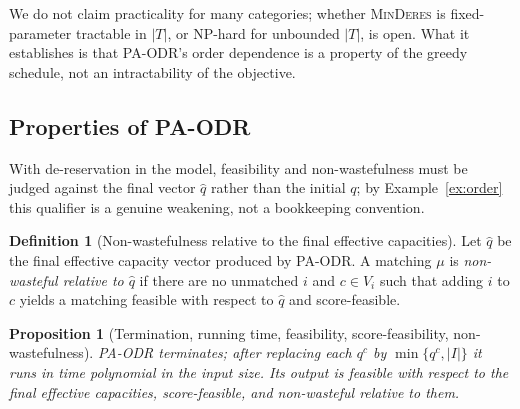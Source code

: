 \documentclass[a4paper,twoside]{article}
\newtheorem{proposition}{Proposition}
\theoremstyle{definition}
\newtheorem{definition}{Definition}
\begin{document}
We do not claim practicality for many categories; whether \textsc{MinDeres} is fixed-parameter tractable in $|T|$, or NP-hard for unbounded $|T|$, is open. What it establishes is that PA-ODR's order dependence is a property of the greedy schedule, not an intractability of the objective.

\subsection{Properties of PA-ODR}

With de-reservation in the model, feasibility and non-wastefulness must be judged against the final vector $\hat q$ rather than the initial $q$; by Example~\ref{ex:order} this qualifier is a genuine weakening, not a bookkeeping convention.

\begin{definition}[Non-wastefulness relative to the final effective capacities]
\label{def:nw-hat}
Let $\hat q$ be the final effective capacity vector produced by PA-ODR. A matching $\mu$ is \emph{non-wasteful relative to $\hat q$} if there are no unmatched $i$ and $c\in V_i$ such that adding $i$ to $c$ yields a matching feasible with respect to $\hat q$ and score-feasible.
\end{definition}

\begin{proposition}[Termination, running time, feasibility, score-feasibility, non-wastefulness]
\label{prop:paodr-basic}
PA-ODR terminates; after replacing each $q^c$ by $\min\{q^c,|I|\}$ it runs in time polynomial in the input size. Its output is feasible with respect to the final effective capacities, score-feasible, and non-wasteful relative to them.
\end{proposition}
\end{document}
